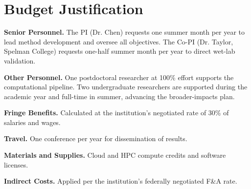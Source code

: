 \section*{Budget Justification}

\textbf{Senior Personnel.} The PI (Dr. Chen) requests one summer month per year to
lead method development and oversee all objectives. The Co-PI (Dr. Taylor, Spelman College)
requests one-half summer month per year to direct wet-lab validation.

\textbf{Other Personnel.} One postdoctoral researcher at 100\% effort supports the
computational pipeline. Two undergraduate researchers are supported during the
academic year and full-time in summer, advancing the broader-impacts plan.

\textbf{Fringe Benefits.} Calculated at the institution's negotiated rate of 30\% of
salaries and wages.

\textbf{Travel.} One conference per year for dissemination of results.

\textbf{Materials and Supplies.} Cloud and HPC compute credits and software licenses.

\textbf{Indirect Costs.} Applied per the institution's federally negotiated F\&A rate.
